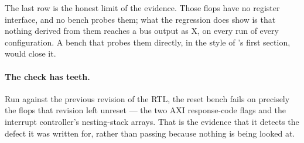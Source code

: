 The last row is the honest limit of the evidence. Those flops have no register
interface, and no bench probes them; what the regression does show is that
nothing derived from them reaches a bus output as X, on every run of every
configuration. A bench that probes them directly, in the style of
's first section, would close it.

\paragraph{The check has teeth.} Run against the previous revision of the RTL,
the reset bench fails on precisely the flops that revision left unreset --- the
two AXI response-code flags and the interrupt controller's nesting-stack arrays.
That is the evidence that it detects the defect it was written for, rather than
passing because nothing is being looked at.
